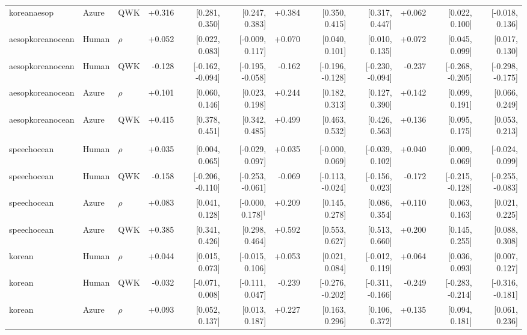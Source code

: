 \documentclass[10pt]{article}
\begin{document}
\begin{landscape}
\begin{longtable}{@{}lllrrrrrrrrr@{}}
koreanaesop & Azure & QWK & +0.316 & [0.281, 0.350] & [0.247, 0.383] & +0.384 & [0.350, 0.415] & [0.317, 0.447] & +0.062 & [0.022, 0.100] & [-0.018, 0.136]\\
\addlinespace[2pt]
aesopkoreanocean & Human & $\rho$ & +0.052 & [0.022, 0.083] & [-0.009, 0.117] & +0.070 & [0.040, 0.101] & [0.010, 0.135] & +0.072 & [0.045, 0.099] & [0.017, 0.130]\\
aesopkoreanocean & Human & QWK & -0.128 & [-0.162, -0.094] & [-0.195, -0.058] & -0.162 & [-0.196, -0.128] & [-0.230, -0.094] & -0.237 & [-0.268, -0.205] & [-0.298, -0.175]\\
aesopkoreanocean & Azure & $\rho$ & +0.101 & [0.060, 0.146] & [0.023, 0.198] & +0.244 & [0.182, 0.313] & [0.127, 0.390] & +0.142 & [0.099, 0.191] & [0.066, 0.249]\\
aesopkoreanocean & Azure & QWK & +0.415 & [0.378, 0.451] & [0.342, 0.485] & +0.499 & [0.463, 0.532] & [0.426, 0.563] & +0.136 & [0.095, 0.175] & [0.053, 0.213]\\
\addlinespace[2pt]
\midrule\multicolumn{12}{l}{\textbf{5G-AMAE: 5-grid pronunciation-accuracy error}}\\*
speechocean & Human & $\rho$ & +0.035 & [0.004, 0.065] & [-0.029, 0.097] & +0.035 & [-0.000, 0.069] & [-0.039, 0.102] & +0.040 & [0.009, 0.069] & [-0.024, 0.099]\\
speechocean & Human & QWK & -0.158 & [-0.206, -0.110] & [-0.253, -0.061] & -0.069 & [-0.113, -0.024] & [-0.156, 0.023] & -0.172 & [-0.215, -0.128] & [-0.255, -0.083]\\
speechocean & Azure & $\rho$ & +0.083 & [0.041, 0.128] & [-0.000, 0.178]$^{\dagger}$ & +0.209 & [0.145, 0.278] & [0.086, 0.354] & +0.110 & [0.063, 0.163] & [0.021, 0.225]\\
speechocean & Azure & QWK & +0.385 & [0.341, 0.426] & [0.298, 0.464] & +0.592 & [0.553, 0.627] & [0.513, 0.660] & +0.200 & [0.145, 0.255] & [0.088, 0.308]\\
\addlinespace[2pt]
korean & Human & $\rho$ & +0.044 & [0.015, 0.073] & [-0.015, 0.106] & +0.053 & [0.021, 0.084] & [-0.012, 0.119] & +0.064 & [0.036, 0.093] & [0.007, 0.127]\\
korean & Human & QWK & -0.032 & [-0.071, 0.008] & [-0.111, 0.047] & -0.239 & [-0.276, -0.202] & [-0.311, -0.166] & -0.249 & [-0.283, -0.214] & [-0.316, -0.181]\\
korean & Azure & $\rho$ & +0.093 & [0.052, 0.137] & [0.013, 0.187] & +0.227 & [0.163, 0.296] & [0.106, 0.372] & +0.135 & [0.094, 0.181] & [0.061, 0.236]\\

\end{longtable}
\end{landscape}
\end{document}
